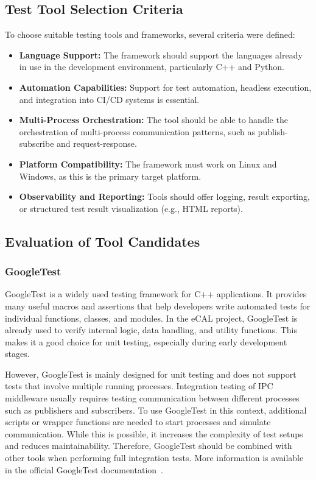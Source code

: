 \subsection{Test Tool Selection Criteria}

To choose suitable testing tools and frameworks, several criteria were defined:

\begin{itemize}
	\item \textbf{Language Support:} The framework should support the languages already in use in the development environment, particularly C++ and Python.
	\item \textbf{Automation Capabilities:} Support for test automation, headless execution, and integration into CI/CD systems is essential.
	\item \textbf{Multi-Process Orchestration:} The tool should be able to handle the orchestration of multi-process communication patterns, such as publish-subscribe and request-response.
	\item \textbf{Platform Compatibility:} The framework must work on Linux and Windows, as this is the primary target platform.
	\item \textbf{Observability and Reporting:} Tools should offer logging, result exporting, or structured test result visualization (e.g., HTML reports).
\end{itemize}

\subsection{Evaluation of Tool Candidates}

\subsubsection*{GoogleTest}

GoogleTest is a widely used testing framework for C++ applications. It provides many useful macros and assertions that help developers write automated tests for individual functions, classes, and modules. In the eCAL project, GoogleTest is already used to verify internal logic, data handling, and utility functions. This makes it a good choice for unit testing, especially during early development stages.

\vspace{1em}
However, GoogleTest is mainly designed for unit testing and does not support tests that involve multiple running processes. Integration testing of IPC middleware usually requires testing communication between different processes such as publishers and subscribers. To use GoogleTest in this context, additional scripts or wrapper functions are needed to start processes and simulate communication. While this is possible, it increases the complexity of test setups and reduces maintainability. Therefore, GoogleTest should be combined with other tools when performing full integration tests. More information is available in the official GoogleTest documentation~\cite{GoogleTestDocs}.

